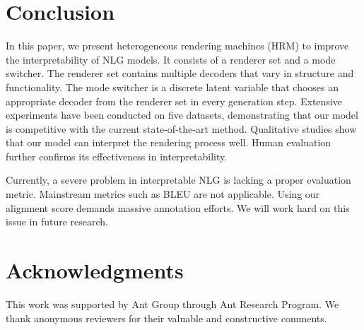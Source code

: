 \documentclass[letterpaper]{article} %
\begin{document}
\section{Conclusion}
	
	In this paper, we present heterogeneous rendering machines (HRM) to improve the interpretability of NLG models. It consists of a renderer set and a mode switcher. The renderer set contains multiple decoders that vary in structure and functionality. The mode switcher is a discrete latent variable that chooses an appropriate decoder from the renderer set in every generation step. Extensive experiments have been conducted on five datasets, demonstrating that our model is competitive with the current state-of-the-art method. Qualitative studies show that our model can interpret the rendering process well. Human evaluation further confirms its effectiveness in interpretability.
	
	Currently, a severe problem in interpretable NLG is lacking a proper evaluation metric. Mainstream metrics such as BLEU are not applicable. Using our alignment score demands massive annotation efforts. We will work hard on this issue in future research.
	
\section*{Acknowledgments}
	
	This work was supported by Ant Group through Ant Research Program. We thank anonymous reviewers for their valuable and constructive comments.
	
	
	
	
\end{document}

